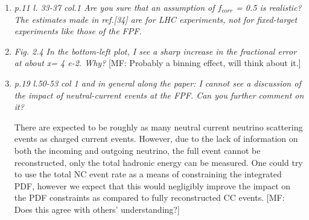 \documentclass[11pt,a4paper]{article}
\begin{document}
\begin{enumerate}
"As pointed out in Ref.~\cite{Kling:2021gos} there are notable neutrino flux uncertainties, as various event generators do not agree on the forward parent hadron spectra. The spread of the generators' predictions can be taken as a means of flux uncertainty, in which case there is a $\lesssim 50\%$ uncertainty on the interacting muon neutrino spectrum --- if left unresolved this would be a significant systematic. Indeed, there are already projections of FPF measurements which would reduce this uncertainty~\cite{Kling:2023tgr} as well as efforts to describe the uncertainty in a data-driven way while improving the modelling of forward hadronization~\cite{Fieg:2023kld}. However, it is important to note that forward neutrino experiments actually constrain the product of flux and cross-section, and one must be assumed to measure the other. In a full analysis, they would be constrained simultaneously in a joint measurement. In our study, we aim to understand the full impact of FPF data on the PDF fit, thus motivating this future joint measurement. To this aim, we take the neutrino flux to be known and focus on the irreducible systematics associated with event reconstruction." 

\item{\it p.11 l. 33-37 col.1 Are you sure that an assumption of $f_{corr}$ = 0.5 is realistic? The estimates made in ref.[34] are for LHC experiments, not for fixed-target experiments like those of the FPF.}

\item{\it  Fig. 2.4 In the bottom-left plot, I see a sharp increase in the fractional error at about x= 4 e-2. Why?}
{\color{red} [MF: Probably a binning effect, will think about it.]}

\item{\it p.19 l.50-53 col 1 and in general along the paper: I cannot see a discussion of the impact of neutral-current events at the FPF. Can you further comment on it?}

There are expected to be roughly as many neutral current neutrino scattering events as charged current events. However, due to the lack of information on both the incoming and outgoing neutrino, the full event cannot be reconstructed, only the total hadronic energy can be measured. One could try to use the total NC event rate as a means of constraining the integrated PDF, however we expect that this would negligibly improve the impact on the PDF constraints as compared to fully reconstructed CC events. {\color{red} [MF: Does this agree with others' understanding?]}


\end{enumerate}
	
\end{document}

